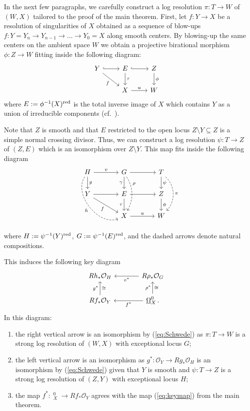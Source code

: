 \documentclass[letterpaper,11pt]{amsart}
\DeclareMathOperator{\DDB}{\underline{\Omega}}
\theoremstyle{plain}
\theoremstyle{definition}
\theoremstyle{remark}
\def\cO{\mathcal{O}}
\begin{document}
In the next few paragraphs, we carefully construct a log resolution $\pi \colon T \to W$ of $(W,X)$ tailored to the proof of the main theorem. First, let $f \colon Y \to X$ be a resolution of singularities of $X$ obtained as a sequence of blow-ups $f \colon Y = Y_n \to Y_{n-1} \to \ldots \to Y_0 = X$ along smooth centers. By blowing-up the same centers on the ambient space $W$ we obtain a projective birational morphism $\phi \colon Z \to W$ fitting inside the following diagram:
\[ \begin{tikzcd} Y \ar[r, hook] \ar[dr, swap, "f"] & E\ar[r, hook] \ar[d, "\tau"] & Z\ar[d, "\phi"]\\ & X \ar[r, "u"] & W\end{tikzcd}\]
where $E := \phi^{-1}(X)^{\rm red}$ is the total inverse image of $X$ which contains $Y$ as a union of irreducible components (cf.\ \cite[Corollary II.7.15]{HartshorneBook}). 

Note that $Z$ is smooth and that $E$ restricted to the open locus $Z \setminus Y \subseteq Z$ is a simple normal crossing divisor. Thus, we can construct a log resolution $\psi \colon T \to Z$ of $(Z,E)$ which is an isomorphism over $Z \setminus Y$. This map fits inside the following diagram
\begin{equation} \label{eq:bigBlowupDiagram} \begin{tikzcd}[column sep = large]  H \ar[r, "v"]  \ar[ddr, bend right = 73, swap, dashed, "h"] \ar[d, "g"] & G \ar[dd, bend left = 30, dashed, "\rho"{pos=0.3}] \ar[r] \ar[d, swap, "\gamma"] & T\ar[d, "\psi"] \ar[dd, bend left = 45, dashed, "\pi"] \\ Y \ar[r] \ar[dr,swap, "f"] & E\ar[r] \ar[d, swap, "\tau"] & Z\ar[d, "\phi"]\\ & X \ar[r, "u"] & W\end{tikzcd}
\end{equation}
where $H := \psi^{-1}(Y)^{\rm red}$, $G := \psi^{-1}(E)^{\rm red}$, and the dashed arrows denote natural compositions.

This induces the following key diagram
\begin{equation} \label{eq:daggerDiagram}
\begin{tikzcd}[column sep = large]
Rh_*\cO_H & \ar{l}{v^*} R\rho_*\cO_G \\
Rf_* \cO_Y \ar{u}{g^*}[swap]{\cong} & \ar{l}{f^*} \DDB^0_X.  \ar{u}{\rho^*}[swap]{\cong}
\end{tikzcd}
\end{equation}
In this diagram:
\begin{enumerate}
    \item the right vertical arrow is an isomorphism by (\ref{eq:Schwede}) as $\pi \colon T \to W$ is a strong log resolution of $(W,X)$ with exceptional locus $G$;
    \item the left vertical arrow is an isomorphism as $g^* \colon \cO_Y \to Rg_*\cO_H$ is an isomorphism by (\ref{eq:Schwede}) given that $Y$ is smooth and $\psi \colon T \to Z$ is a strong log resolution of $(Z,Y)$ with exceptional locus $H$;
    \item the map $f^* \colon \DDB^0_X \to Rf_*\cO_Y$ agrees with the map (\ref{eq:keymap}) from the main theorem.  
\end{enumerate}
\end{document}
